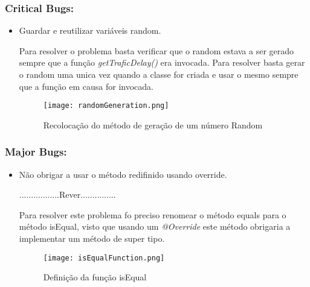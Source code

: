 \subsubsection{Critical Bugs:}
\begin{itemize}
\item Guardar e reutilizar variáveis random. \newline


\par Para resolver o problema basta verificar que o random estava a ser gerado sempre que a função \textit{getTraficDelay()} era invocada. Para resolver basta gerar o random uma unica vez quando a classe for criada e usar o mesmo sempre que a função em causa for invocada.

\begin{figure}[H]

  \centering

  \texttt{[image: randomGeneration.png]}

  \caption {Recolocação do método de geração de um número Random}

  \label {fig06}

\end{figure}
\end{itemize}

\subsubsection{Major Bugs:}
\begin{itemize}
\item Não obrigar a usar o método redifinido usando override.\newline


.................Rever...............
\par Para resolver este problema fo preciso renomear o método equals para o método isEqual, visto que usando um \textit{@Override} este método obrigaria a implementar um método de super tipo.

\begin{figure}[H]

  \centering

  \texttt{[image: isEqualFunction.png]}

  \caption {Definição da função isEqual}

  \label {fig07}

\end{figure}

\end{itemize}

